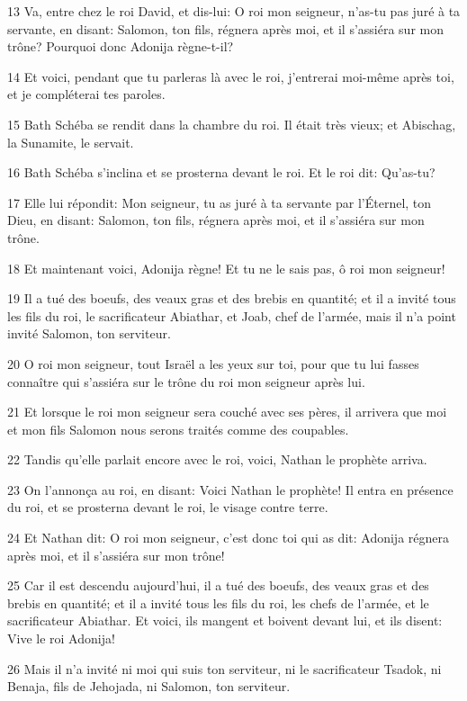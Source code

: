 \par 13 Va, entre chez le roi David, et dis-lui: O roi mon seigneur, n'as-tu pas juré à ta servante, en disant: Salomon, ton fils, régnera après moi, et il s'assiéra sur mon trône? Pourquoi donc Adonija règne-t-il?
\par 14 Et voici, pendant que tu parleras là avec le roi, j'entrerai moi-même après toi, et je compléterai tes paroles.
\par 15 Bath Schéba se rendit dans la chambre du roi. Il était très vieux; et Abischag, la Sunamite, le servait.
\par 16 Bath Schéba s'inclina et se prosterna devant le roi. Et le roi dit: Qu'as-tu?
\par 17 Elle lui répondit: Mon seigneur, tu as juré à ta servante par l'Éternel, ton Dieu, en disant: Salomon, ton fils, régnera après moi, et il s'assiéra sur mon trône.
\par 18 Et maintenant voici, Adonija règne! Et tu ne le sais pas, ô roi mon seigneur!
\par 19 Il a tué des boeufs, des veaux gras et des brebis en quantité; et il a invité tous les fils du roi, le sacrificateur Abiathar, et Joab, chef de l'armée, mais il n'a point invité Salomon, ton serviteur.
\par 20 O roi mon seigneur, tout Israël a les yeux sur toi, pour que tu lui fasses connaître qui s'assiéra sur le trône du roi mon seigneur après lui.
\par 21 Et lorsque le roi mon seigneur sera couché avec ses pères, il arrivera que moi et mon fils Salomon nous serons traités comme des coupables.
\par 22 Tandis qu'elle parlait encore avec le roi, voici, Nathan le prophète arriva.
\par 23 On l'annonça au roi, en disant: Voici Nathan le prophète! Il entra en présence du roi, et se prosterna devant le roi, le visage contre terre.
\par 24 Et Nathan dit: O roi mon seigneur, c'est donc toi qui as dit: Adonija régnera après moi, et il s'assiéra sur mon trône!
\par 25 Car il est descendu aujourd'hui, il a tué des boeufs, des veaux gras et des brebis en quantité; et il a invité tous les fils du roi, les chefs de l'armée, et le sacrificateur Abiathar. Et voici, ils mangent et boivent devant lui, et ils disent: Vive le roi Adonija!
\par 26 Mais il n'a invité ni moi qui suis ton serviteur, ni le sacrificateur Tsadok, ni Benaja, fils de Jehojada, ni Salomon, ton serviteur.
